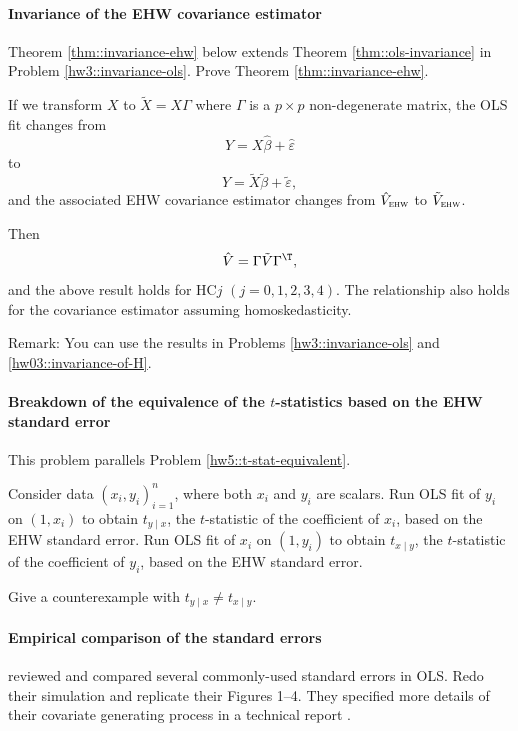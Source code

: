  
 \paragraph{Invariance of the EHW covariance estimator}
\label{hw08::invariance-ehw01234}


Theorem \ref{thm::invariance-ehw} below extends Theorem \ref{thm::ols-invariance} in Problem \ref{hw3::invariance-ols}. 
Prove Theorem \ref{thm::invariance-ehw}. 

\begin{theorem}
\label{thm::invariance-ehw}
If we transform $X$ to $\tilde{X} = X\Gamma$ where $\Gamma$ is a $p\times p$ non-degenerate matrix, the OLS fit changes from
$$
Y = X\hat{\beta} + \hat{\varepsilon}
$$
to
$$
Y = \tilde{X}\tilde{\beta} + \tilde{\varepsilon},
$$
and the associated EHW covariance estimator changes from $\hat{V}_\textsc{ehw}$ to $\tilde{V}_\textsc{ehw}$. 

Then
$$
\hat{V} = \Gamma \tilde{V}  \Gamma^{\T},
$$ 
and the above result holds for HC$j$ $(j=0,1,2,3,4)$. The relationship also holds for the covariance estimator assuming homoskedasticity. 
\end{theorem}




Remark: You can use the results in Problems \ref{hw3::invariance-ols} and \ref{hw03::invariance-of-H}. 







\paragraph{Breakdown of the equivalence of the $t$-statistics based on the EHW standard error}\label{hw6::t-stat-equivalent-breakdown}


This problem parallels Problem \ref{hw5::t-stat-equivalent}. 


Consider data $(x_i, y_i)_{i=1}^n$, where both $x_i$ and $y_i$ are scalars. Run OLS fit of $y_i$ on $(1,x_i)$ to obtain $t_{y\mid x}$, the $t$-statistic of the coefficient of $x_i$, based on the EHW standard error. Run OLS fit of $x_i$ on $(1,y_i)$ to obtain $t_{x\mid y}$, the $t$-statistic of the coefficient of $y_i$, based on the EHW standard error. 

Give a counterexample with $t_{y\mid x} \neq  t_{x\mid y}$.




 
 
\paragraph{Empirical comparison of the standard errors}
\citet{long2000using} reviewed and compared several commonly-used standard errors in OLS. Redo their simulation and replicate their Figures 1--4. They specified more details of their covariate generating process in a technical report \citep{long1998correcting}. 


